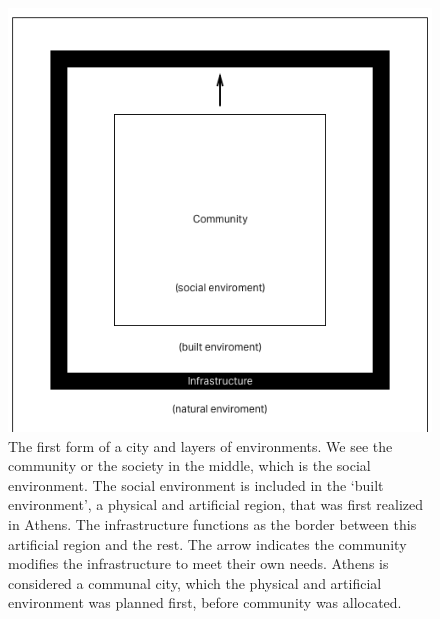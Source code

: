 \begin{figure}
    \includegraphics[width=\textwidth]{chapters/2/fig/primitive.png}               
    \caption[layers of environments]{
        The first form of a city and layers of environments. We see the community or the society in the middle,
        which is the social environment. The social environment is included in the `built environment', a physical and
        artificial region, that was first realized in Athens. The infrastructure functions as the border between this artificial
        region and the rest. The arrow indicates the community modifies the infrastructure to meet their own needs. Athens is considered
        a communal city, which the physical and artificial environment was planned first, before community was allocated.
    }
    \label{fig:diagram_primitive}
\end{figure}


